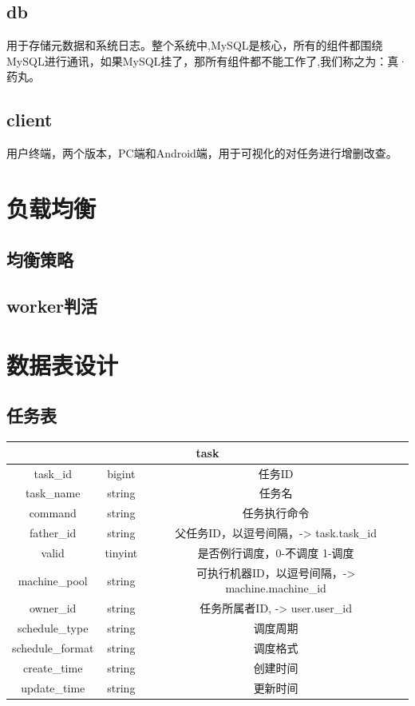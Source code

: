 ﻿\documentclass[a4paper]{report}
\begin{document}
\subsection{db}
用于存储元数据和系统日志。整个系统中,MySQL是核心，所有的组件都围绕MySQL进行通讯，如果MySQL挂了，那所有组件都不能工作了,我们称之为：真·药丸。

\subsection{client}
用户终端，两个版本，PC端和Android端，用于可视化的对任务进行增删改查。









\section{负载均衡} %
\subsection{均衡策略} %
\subsection{worker判活} %



\section{数据表设计} %

\subsection{任务表} %
\begin{tabular}{|c|c|c|}
	\hline \multicolumn{3}{|c|}{task}\\
	\hline task\_id           &bigint    &任务ID\\
	\hline task\_name         &string    &任务名\\
	\hline command            &string    &任务执行命令\\
	\hline father\_id         &string    &父任务ID，以逗号间隔，-> task.task\_id\\
	\hline valid      	      &tinyint   &是否例行调度，0-不调度 1-调度\\
	\hline machine\_pool      &string    &可执行机器ID，以逗号间隔，-> machine.machine\_id\\
	\hline owner\_id   	      &string    &任务所属者ID, -> user.user\_id\\
	\hline schedule\_type     &string    &调度周期\\
	\hline schedule\_format   &string    &调度格式\\
	\hline create\_time   	  &string    &创建时间\\
	\hline update\_time       &string    &更新时间\\
	\hline 
\end{tabular}
\end{document}
